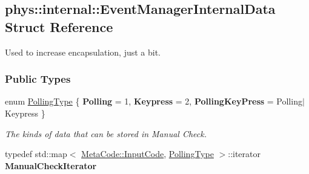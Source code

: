 \hypertarget{structphys_1_1internal_1_1EventManagerInternalData}{
\subsection{phys::internal::EventManagerInternalData Struct Reference}
\label{d6/d3a/structphys_1_1internal_1_1EventManagerInternalData}
}


Used to increase encapsulation, just a bit.  


\subsubsection*{Public Types}
\begin{DoxyCompactItemize}
\item 
enum \hyperlink{structphys_1_1internal_1_1EventManagerInternalData_ab9ab8380b84448aacf46a63050e159af}{PollingType} \{ {\bfseries Polling} = 1, 
{\bfseries Keypress} = 2, 
{\bfseries PollingKeyPress} =  Polling$|$Keypress
 \}
\begin{DoxyCompactList}\small\item\em The kinds of data that can be stored in Manual Check. \item\end{DoxyCompactList}\item 
\hypertarget{structphys_1_1internal_1_1EventManagerInternalData_ad2b9c7924f32e299846f1d945cb82dc0}{
typedef std::map$<$ \hyperlink{classphys_1_1MetaCode_a3e501cbb5bf0f6f1fdb7211465bda8d8}{MetaCode::InputCode}, \hyperlink{structphys_1_1internal_1_1EventManagerInternalData_ab9ab8380b84448aacf46a63050e159af}{PollingType} $>$::iterator {\bfseries ManualCheckIterator}}
\label{d6/d3a/structphys_1_1internal_1_1EventManagerInternalData_ad2b9c7924f32e299846f1d945cb82dc0}

\end{DoxyCompactItemize}
